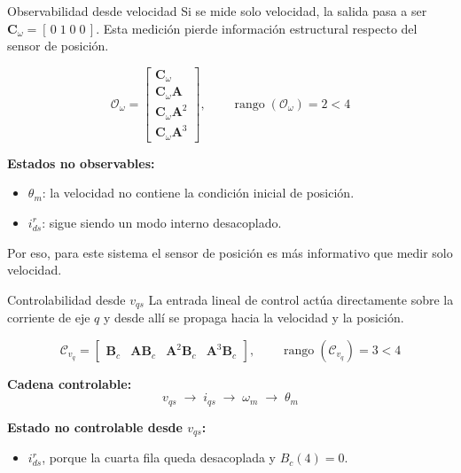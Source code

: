 \documentclass[aspectratio=169,t]{beamer}
\begin{document}
\begin{frame}{Observabilidad desde velocidad}
{\small\color{uncGray}Si se mide solo velocidad, la salida pasa a ser $\bm{C}_\omega=[\,0\;1\;0\;0\,]$. Esta medición pierde información estructural respecto del sensor de posición.}\par
\vspace{3mm}

\begin{equation*}
\mathcal{O}_\omega=
\begin{bmatrix}
\bm{C}_\omega\\
\bm{C}_\omega\bm{A}\\
\bm{C}_\omega\bm{A}^2\\
\bm{C}_\omega\bm{A}^3
\end{bmatrix},
\qquad
\operatorname{rango}(\mathcal{O}_\omega)=2<4
\end{equation*}

\textbf{Estados no observables:}
\begin{itemize}
  \item $\theta_m$: la velocidad no contiene la condición inicial de posición.
  \item $i_{ds}^{r}$: sigue siendo un modo interno desacoplado.
\end{itemize}

{\small Por eso, para este sistema el sensor de posición es más informativo que medir solo velocidad.}
\end{frame}

\begin{frame}{Controlabilidad desde $v_{qs}$}
{\small\color{uncGray}La entrada lineal de control actúa directamente sobre la corriente de eje $q$ y desde allí se propaga hacia la velocidad y la posición.}\par
\vspace{3mm}

\begin{equation*}
\mathcal{C}_{v_q}=
\begin{bmatrix}
\bm{B}_c & \bm{A}\bm{B}_c & \bm{A}^2\bm{B}_c & \bm{A}^3\bm{B}_c
\end{bmatrix},
\qquad
\operatorname{rango}(\mathcal{C}_{v_q})=3<4
\end{equation*}

\textbf{Cadena controlable:}
\begin{equation*}
v_{qs}\;\longrightarrow\;i_{qs}\;\longrightarrow\;\omega_m\;\longrightarrow\;\theta_m
\end{equation*}

\textbf{Estado no controlable desde $v_{qs}$:}
\begin{itemize}
  \item $i_{ds}^{r}$, porque la cuarta fila queda desacoplada y $B_c(4)=0$.
\end{itemize}
\end{frame}
\end{document}

